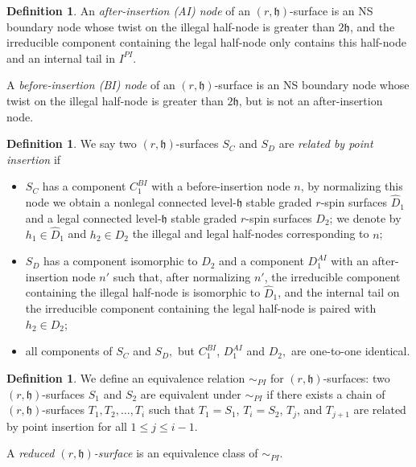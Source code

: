\documentclass[11pt,a4paper]{article}
\theoremstyle{definition}
\newtheorem{dfn}[dummy]{Definition}
\theoremstyle{remark}
\numberwithin{equation}{section}
\def\h{{\mathfrak h}}
\begin{document}
\begin{dfn}
    An \textit{after-insertion (AI) node} of an $(r,\h)$-surface is an NS boundary node whose twist on the illegal half-node is greater than $2\h$, and the irreducible component containing the legal half-node only contains this half-node and an internal tail in $I^{PI}$.

    A \textit{before-insertion (BI) node} of an $(r,\h)$-surface is an NS boundary node whose twist on the illegal half-node is greater than $2\h$, but is not an after-insertion node.
\end{dfn}

\begin{dfn}
    We say two $(r,\h)$-surfaces $S_C$ and $S_D$ are \textit{related by point insertion} if 
    \begin{itemize}
        \item  $S_C$ has a component $C_1^{BI}$ with a before-insertion node $n$, by normalizing this node we obtain a nonlegal connected level-$\h$ stable graded $r$-spin surfaces $\hat D_1$ and a legal connected level-$\h$ stable graded $r$-spin surfaces $D_2$; we denote by $h_1\in \hat D_1$ and $h_2\in D_2$ the illegal and legal half-nodes corresponding to $n$;
        \item $S_D$ has a component isomorphic to $D_2$ and a component $D_1^{AI}$ with an after-insertion node $n'$ such that, after normalizing $n'$,  the irreducible component containing the illegal half-node is isomorphic to $\hat D_1$, and the internal tail on the irreducible component containing the legal half-node is paired with $h_2\in D_2$;
        \item all components of $S_C$ and $S_D,$ but $C_1^{BI}$, $D_1^{AI}$ and $D_2,$ are one-to-one identical.
    \end{itemize}
\end{dfn}

\begin{dfn}\label{def reduced rh surface}
    We define an equivalence relation $\sim_{PI}$ for $(r,\h)$-surfaces:
     two $(r,\h)$-surfaces $S_1$ and $S_2$ are equivalent under $\sim_{PI}$ if there exists a chain of $(r,\h)$-surfaces $T_1,T_2,\dots,T_i$ such that $T_1=S_1$, $T_i=S_2$, $T_j$, and $T_{j+1}$ are related by point insertion for all $1\le j\le i-1$. 
     
    A \textit{reduced $(r,\h)$-surface} is an equivalence class of $\sim_{PI}$.
\end{dfn}
 
\end{document}

